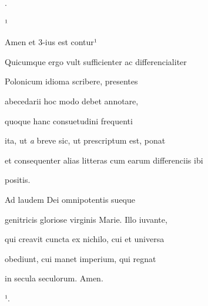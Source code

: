 \indentVerse {}.

  

 

\splitlines
{}
\indentVerse {} 

  ¹ 

\splitlines
{}  

 

\splitlines

\indentVerse {}


Amen et 3-ius est contur¹

\fulllines

Quicumque ergo vult sufficienter ac differencialiter

Polonicum idioma scribere, presentes 

 abecedarii hoc modo debet annotare, 

 quoque hanc consuetudini frequenti 

 ita, ut \textit{a} breve sic, ut prescriptum est, ponat

et consequenter alias litteras cum earum differenciis ibi

positis.

Ad laudem Dei omnipotentis sueque

genitricis gloriose virginis Marie. Illo iuvante,

qui creavit cuncta ex nichilo, cui et universa

obediunt, cui manet imperium, qui regnat

in secula seculorum. Amen.

  

  ¹.






